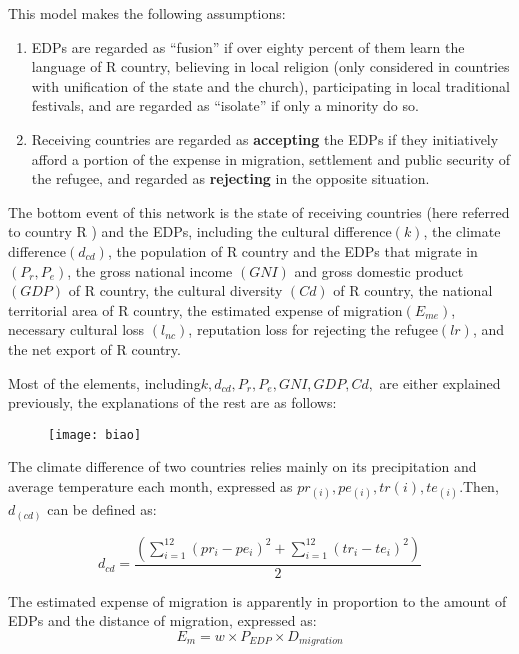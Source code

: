 \documentclass{mcmthesis}
\begin{document}
This model makes the following assumptions:
\begin{enumerate}

\item EDPs are regarded as “fusion” if over eighty percent of them learn the language of R country, believing in local religion (only considered in countries with unification of the state and the church), participating in local traditional festivals, and are regarded as “isolate” if only a minority do so.
\item Receiving countries are regarded as \textbf{accepting} the EDPs if they initiatively afford a portion of the expense in migration, settlement and public security of the refugee, and regarded as \textbf{rejecting} in the opposite situation.
\end{enumerate}

The bottom event of this network is the state of receiving countries (here referred to country R ) and the EDPs, including the cultural difference$ (k) $, the climate difference$ (d_{cd}) $, the population of R country and the EDPs that migrate in $ (P_{r},P_{e}) $, the gross national income $ (GNI) $ and gross domestic product $ (GDP) $ of R country, the cultural diversity $ (Cd) $ of R country, the national territorial area of R country, the estimated expense of migration$  (E_{me}) $, necessary cultural loss $ (l_{nc}) $, reputation loss for rejecting the refugee$ (lr) $, and the net export of R country. 

Most of the elements, including$  k, d_{cd}, P_{r}, P_{e}, GNI, GDP, Cd, $ are either explained previously, the explanations of the rest are as follows:
\begin{figure}[h]%
	\small
	\centering
	\texttt{[image: biao]}%
\end{figure}

The climate difference of two countries relies mainly on its precipitation and average temperature each month, expressed as $ pr_{(i)}, pe_{(i)}, tr(i), te_{(i)} $.Then, $ d_{(cd)} $ can be defined as:

\begin{equation}
d_{cd}=\dfrac{(\sum_{i=1}^{12}(pr_{i}-pe_{i})^{2}+\sum_{i=1}^{12}(tr_{i}-te_{i})^{2})}{2}
\end{equation}

The estimated expense of migration is apparently in proportion to the amount of EDPs and the distance of migration, expressed as:
\begin{equation}
E_{m}=w{\times}P_{EDP}{\times}D_{migration}
\end{equation}
\end{document}
